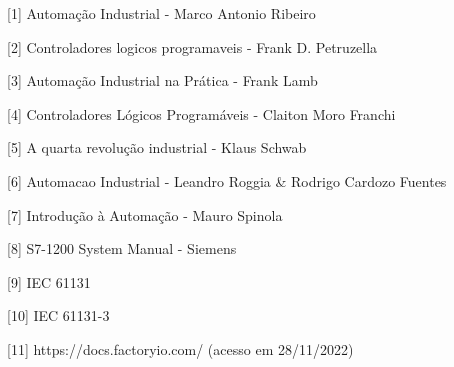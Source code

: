 \documentclass[a4paper, 12pt]{article}
\begin{document}
[1] Automação Industrial - Marco Antonio Ribeiro

[2] Controladores logicos programaveis - Frank D. Petruzella

[3] Automação Industrial na Prática - Frank Lamb

[4] Controladores Lógicos Programáveis - Claiton Moro Franchi

[5] A quarta revolução industrial - Klaus Schwab

[6] Automacao Industrial - Leandro Roggia \& Rodrigo Cardozo Fuentes

[7] Introdução à Automação - Mauro Spinola

[8] S7-1200 System Manual - Siemens

[9] IEC 61131

[10] IEC 61131-3

[11] https://docs.factoryio.com/ (acesso em 28/11/2022)
\end{document}
